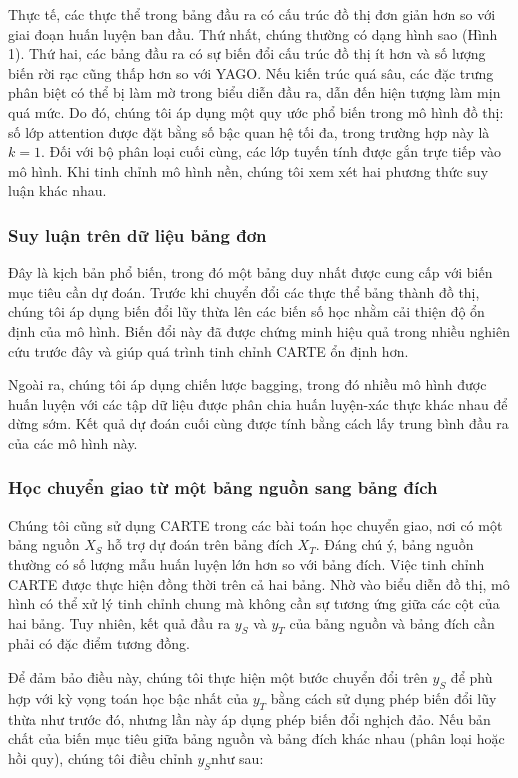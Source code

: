 \documentclass{article}
\begin{document}
Thực tế, các thực thể trong bảng đầu ra có cấu trúc đồ thị đơn giản hơn so với giai đoạn huấn luyện ban đầu. Thứ nhất, chúng thường có dạng hình sao (Hình 1). Thứ hai, các bảng đầu ra có sự biến đổi cấu trúc đồ thị ít hơn và số lượng biến rời rạc cũng thấp hơn so với YAGO. Nếu kiến trúc quá sâu, các đặc trưng phân biệt có thể bị làm mờ trong biểu diễn đầu ra, dẫn đến hiện tượng làm mịn quá mức. Do đó, chúng tôi áp dụng một quy ước phổ biến trong mô hình đồ thị: số lớp attention được đặt bằng số bậc quan hệ tối đa, trong trường hợp này là $k=1$. Đối với bộ phân loại cuối cùng, các lớp tuyến tính được gắn trực tiếp vào mô hình. Khi tinh chỉnh mô hình nền, chúng tôi xem xét hai phương thức suy luận khác nhau.

\subsubsection{Suy luận trên dữ liệu bảng đơn}
Đây là kịch bản phổ biến, trong đó một bảng duy nhất được cung cấp với biến mục tiêu cần dự đoán. Trước khi chuyển đổi các thực thể bảng thành đồ thị, chúng tôi áp dụng biến đổi lũy thừa lên các biến số học nhằm cải thiện độ ổn định của mô hình. Biến đổi này đã được chứng minh hiệu quả trong nhiều nghiên cứu trước đây và giúp quá trình tinh chỉnh CARTE ổn định hơn.

Ngoài ra, chúng tôi áp dụng chiến lược bagging, trong đó nhiều mô hình được huấn luyện với các tập dữ liệu được phân chia huấn luyện-xác thực khác nhau để dừng sớm. Kết quả dự đoán cuối cùng được tính bằng cách lấy trung bình đầu ra của các mô hình này.

\subsubsection{Học chuyển giao từ một bảng nguồn sang bảng đích}
Chúng tôi cũng sử dụng CARTE trong các bài toán học chuyển giao, nơi có một bảng nguồn 
$X_S$ hỗ trợ dự đoán trên bảng đích $X_T$. Đáng chú ý, bảng nguồn thường có số lượng mẫu huấn luyện lớn hơn so với bảng đích. Việc tinh chỉnh CARTE được thực hiện đồng thời trên cả hai bảng. Nhờ vào biểu diễn đồ thị, mô hình có thể xử lý tinh chỉnh chung mà không cần sự tương ứng giữa các cột của hai bảng. Tuy nhiên, kết quả đầu ra $y_S$ và $y_T$ của bảng nguồn và bảng đích cần phải có đặc điểm tương đồng.

Để đảm bảo điều này, chúng tôi thực hiện một bước chuyển đổi trên $y_S$ để phù hợp với kỳ vọng toán học bậc nhất của $y_T$ bằng cách sử dụng phép biến đổi lũy thừa như trước đó, nhưng lần này áp dụng phép biến đổi nghịch đảo. Nếu bản chất của biến mục tiêu giữa bảng nguồn và bảng đích khác nhau (phân loại hoặc hồi quy), chúng tôi điều chỉnh $y_S$như sau:
\end{document}
